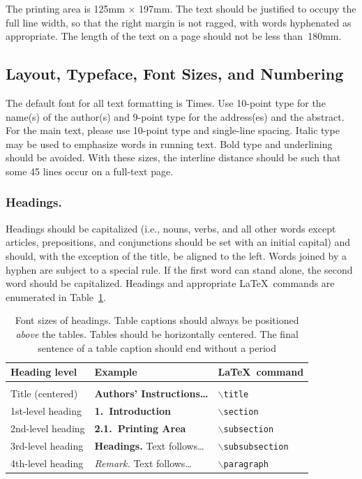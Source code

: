 \documentclass[runningheads]{comsis2}
\begin{document}
The printing area is 125mm $\times$ 197mm. The text should be justified to
occupy the full line width, so that the right margin is not ragged, with words
hyphenated as appropriate. The length of the text on a page should not be less
than~180mm.

\subsection{Layout, Typeface, Font Sizes, and Numbering}

The default font for all text formatting is Times. Use 10-point type for the
name(s) of the author(s) and 9-point type for the address(es) and the abstract.
For the main text, please use 10-point type and single-line spacing. Italic type
may be used to emphasize words in running text. Bold type and underlining should
be avoided. With these sizes, the interline distance should be such that some 45
lines occur on a full-text page.

\subsubsection{Headings.} Headings should be capitalized (i.e., nouns, verbs, and
all other words except articles, prepositions, and conjunctions should be set
with an initial capital) and should, with the exception of the title, be
aligned to the left. Words joined by a hyphen are subject to a special rule.
If the first word can stand alone, the second word should be capitalized.
Headings and appropriate \LaTeX\ commands are enumerated in
Table~\ref{tbl:headings}.

\begin{table}
\caption{Font sizes of headings. Table captions should always be positioned
\emph{above} the tables. Tables should be horizontally centered. The final
sentence of a table caption should end without a period}\label{tbl:headings}
\centering
\setlength\tabcolsep{0.5em}
\begin{tabular}{lll}
\hline
Heading level      & Example                                    & \LaTeX\ command \\ \hline \\[-2ex]
Title (centered)   & \textbf{\Large Authors' Instructions\dots} & \texttt{$\backslash$title} \\
1st-level heading  & \textbf{\large 1.\ Introduction}           & \texttt{$\backslash$section} \\
2nd-level heading  & \textbf{2.1.\ Printing Area}               & \texttt{$\backslash$subsection} \\
3rd-level heading  & \textbf{Headings.} Text follows\dots       & \texttt{$\backslash$subsubsection} \\
4th-level heading  & \textit{Remark.} Text follows\dots         & \texttt{$\backslash$paragraph} \\ \hline
\end{tabular}
\end{table}
\end{document}
